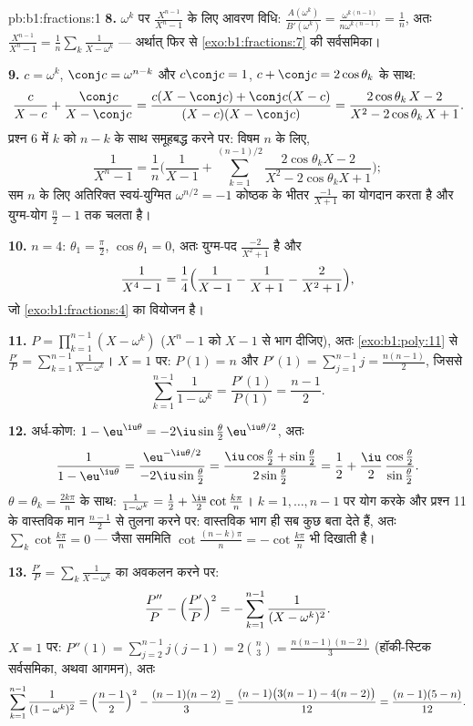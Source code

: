 \begin{solution}{pb:b1:fractions:1}
\textbf{8.} $\omega^k$ पर $\frac{X^{n-1}}{X^n - 1}$ के लिए आवरण विधि:
$\frac{A(\omega^k)}{B'(\omega^k)} = \frac{\omega^{k(n-1)}}{n\omega^{k(n-1)}}
= \frac1n$, अतः $\frac{X^{n-1}}{X^n-1} = \frac1n\sum_k\frac1{X - \omega^k}$
--- अर्थात् फिर से \cref{exo:b1:fractions:7} की सर्वसमिका।

\textbf{9.} $c = \omega^k$, $\conj c = \omega^{n-k}$ और $c\conj c = 1$, $c +
\conj c = 2\cos\theta_k$ के साथ:
\[
\frac{c}{X - c} + \frac{\conj c}{X - \conj c}
= \frac{c(X - \conj c) + \conj c(X - c)}
{(X - c)(X - \conj c)}
= \frac{2\cos\theta_k\,X - 2}{X^2 - 2\cos\theta_k\,X + 1} .
\]
प्रश्न 6 में $k$ को $n - k$ के साथ समूहबद्ध करने पर: विषम $n$ के लिए,
\[
\frac1{X^n - 1} = \frac1n\Biggl(\frac1{X-1} +
\sum_{k=1}^{(n-1)/2}
\frac{2\cos\theta_k X - 2}{X^2 - 2\cos\theta_k X + 1}\Biggr) ;
\]
सम $n$ के लिए अतिरिक्त स्वयं-युग्मित  $\omega^{n/2} = -1$ कोष्ठक के
भीतर $\frac{-1}{X+1}$ का योगदान करता है और युग्म-योग $\frac n2 - 1$ तक चलता
है।

\textbf{10.} $n = 4$: $\theta_1 = \frac\pi2$, $\cos\theta_1 = 0$, अतः
युग्म-पद $\frac{-2}{X^2+1}$ है और
\[
\frac1{X^4-1} = \frac14\Bigl(\frac1{X-1} - \frac1{X+1}
- \frac2{X^2+1}\Bigr) ,
\]
जो \cref{exo:b1:fractions:4} का वियोजन है।

\textbf{11.} $P = \prod_{k=1}^{n-1}(X - \omega^k)$ ($X^n - 1$ को $X - 1$ से
भाग दीजिए), अतः \cref{exo:b1:poly:11} से $\frac{P'}P =
\sum_{k=1}^{n-1}\frac1{X-\omega^k}$। $X = 1$ पर: $P(1) = n$ और $P'(1) =
\sum_{j=1}^{n-1}j = \frac{n(n-1)}2$, जिससे
\[
\sum_{k=1}^{n-1}\frac1{1 - \omega^k}
= \frac{P'(1)}{P(1)} = \frac{n-1}2 .
\]

\textbf{12.} अर्ध-कोण: $1 - \eu^{\iu\theta} =
-2\iu\sin\frac\theta2\,\eu^{\iu\theta/2}$, अतः
\[
\frac1{1 - \eu^{\iu\theta}}
= \frac{\eu^{-\iu\theta/2}}{-2\iu\sin\frac\theta2}
= \frac{\iu\cos\frac\theta2 + \sin\frac\theta2}
{2\sin\frac\theta2}
= \frac12 + \frac\iu2\,
\frac{\cos\frac\theta2}{\sin\frac\theta2} .
\]
$\theta = \theta_k = \frac{2k\pi}n$ के साथ: $\frac1{1-\omega^k} = \frac12 +
\frac\iu2\cot\frac{k\pi}n$। $k = 1, \dots, n-1$ पर योग करके और प्रश्न 11 के
वास्तविक मान $\frac{n-1}2$ से तुलना करने पर: वास्तविक भाग ही सब कुछ बता देते
हैं, अतः $\sum_k\cot\frac{k\pi}n = 0$ --- जैसा सममिति $\cot\frac{(n-k) \pi}n
= -\cot\frac{k\pi}n$ भी दिखाती है।

\textbf{13.} $\frac{P'}P = \sum_k\frac1{X - \omega^k}$ का अवकलन करने पर:
\[
\frac{P''}P - \Bigl(\frac{P'}P\Bigr)^2
= -\sum_{k=1}^{n-1}\frac1{(X - \omega^k)^2} .
\]
$X = 1$ पर: $P''(1) = \sum_{j=2}^{n-1}j(j-1) = 2\binom n3 =
\frac{n(n-1)(n-2)}3$ (हॉकी-स्टिक सर्वसमिका, अथवा आगमन), अतः
\[
\sum_{k=1}^{n-1}\frac1{(1 - \omega^k)^2}
= \Bigl(\frac{n-1}2\Bigr)^2 - \frac{(n-1)(n-2)}3
= \frac{(n-1)\bigl(3(n-1) - 4(n-2)\bigr)}{12}
= \frac{(n-1)(5-n)}{12} .
\]


\end{solution}
